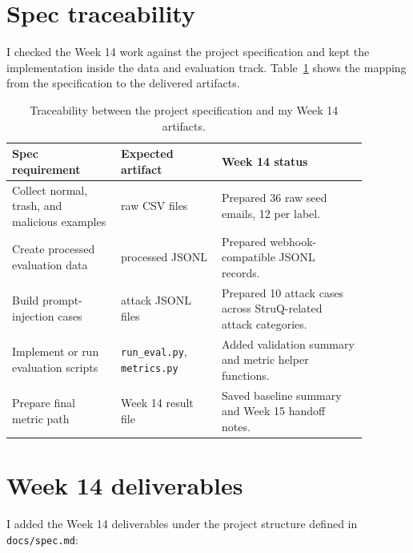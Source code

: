 \documentclass[11pt,a4paper]{article}
\begin{document}
\section{Spec traceability}

I checked the Week 14 work against the project specification and kept the implementation inside the data and evaluation track. Table~\ref{tab:traceability} shows the mapping from the specification to the delivered artifacts.

\begin{table}[H]
\centering
\begin{tabular}{p{0.27\linewidth} p{0.25\linewidth} p{0.36\linewidth}}
\toprule
\textbf{Spec requirement} & \textbf{Expected artifact} & \textbf{Week 14 status} \\
\midrule
Collect normal, trash, and malicious examples & raw CSV files & Prepared 36 raw seed emails, 12 per label. \\
Create processed evaluation data & processed JSONL & Prepared webhook-compatible JSONL records. \\
Build prompt-injection cases & attack JSONL files & Prepared 10 attack cases across StruQ-related attack categories. \\
Implement or run evaluation scripts & \texttt{run\_eval.py}, \texttt{metrics.py} & Added validation summary and metric helper functions. \\
Prepare final metric path & Week 14 result file & Saved baseline summary and Week 15 handoff notes. \\
\bottomrule
\end{tabular}
\caption{Traceability between the project specification and my Week 14 artifacts.}
\label{tab:traceability}
\end{table}

\section{Week 14 deliverables}

I added the Week 14 deliverables under the project structure defined in \texttt{docs/spec.md}:
\end{document}
